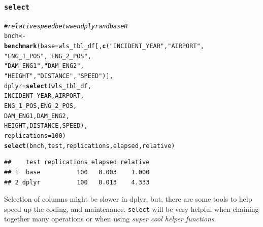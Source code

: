 \documentclass{beamer}\usepackage[]{graphicx}\usepackage[]{color}
\makeatletter
\newcommand{\hlnum}[1]{\textcolor[rgb]{0.686,0.059,0.569}{#1}}%
\newcommand{\hlstr}[1]{\textcolor[rgb]{0.192,0.494,0.8}{#1}}%
\newcommand{\hlcom}[1]{\textcolor[rgb]{0.678,0.584,0.686}{\textit{#1}}}%
\newcommand{\hlstd}[1]{\textcolor[rgb]{0.345,0.345,0.345}{#1}}%
\newcommand{\hlkwb}[1]{\textcolor[rgb]{0.69,0.353,0.396}{#1}}%
\newcommand{\hlkwc}[1]{\textcolor[rgb]{0.333,0.667,0.333}{#1}}%
\newcommand{\hlkwd}[1]{\textcolor[rgb]{0.737,0.353,0.396}{\textbf{#1}}}%
\newenvironment{kframe}{%
 \def\at@end@of@kframe{}%
 \ifinner\ifhmode%
  \def\at@end@of@kframe{\end{minipage}}%
  \begin{minipage}{\columnwidth}%
 \fi\fi%
 \def\FrameCommand##1{\hskip\@totalleftmargin \hskip-\fboxsep
 \colorbox{shadecolor}{##1}\hskip-\fboxsep
     \hskip-\linewidth \hskip-\@totalleftmargin \hskip\columnwidth}%
 \MakeFramed {\advance\hsize-\width
   \@totalleftmargin\z@ \linewidth\hsize
   \@setminipage}}%
 {\par\unskip\endMakeFramed%
 \at@end@of@kframe}
\newenvironment{knitrout}{}{} %
\makeatother
\begin{document}
\begin{frame}[fragile]
  \frametitle{{\tt select}}
\begin{knitrout}\footnotesize
{}\color{fgcolor}\begin{kframe}
\begin{alltt}
\hlcom{# relative speed betwwen dplyr and base R}
\hlstd{bnch} \hlkwb{<-}
  \hlkwd{benchmark}\hlstd{(}\hlkwc{base}  \hlstd{= wls_tbl_df[,} \hlkwd{c}\hlstd{(}\hlstr{"INCIDENT_YEAR"}\hlstd{,} \hlstr{"AIRPORT"}\hlstd{,}
                                   \hlstr{"ENG_1_POS"}\hlstd{,} \hlstr{"ENG_2_POS"}\hlstd{,}
                                   \hlstr{"DAM_ENG1"}\hlstd{,} \hlstr{"DAM_ENG2"}\hlstd{,}
                                   \hlstr{"HEIGHT"}\hlstd{,} \hlstr{"DISTANCE"}\hlstd{,} \hlstr{"SPEED"}\hlstd{)],}
            \hlkwc{dplyr} \hlstd{=} \hlkwd{select}\hlstd{(wls_tbl_df,}
                           \hlstd{INCIDENT_YEAR, AIRPORT,}
                           \hlstd{ENG_1_POS, ENG_2_POS,}
                           \hlstd{DAM_ENG1, DAM_ENG2,}
                           \hlstd{HEIGHT, DISTANCE, SPEED),}
            \hlkwc{replications} \hlstd{=} \hlnum{100}\hlstd{)}
\hlkwd{select}\hlstd{(bnch, test, replications, elapsed, relative)}
\end{alltt}
\begin{verbatim}
##    test replications elapsed relative
## 1  base          100   0.003    1.000
## 2 dplyr          100   0.013    4.333
\end{verbatim}
\end{kframe}
\end{knitrout}

Selection of columns might be slower in dplyr, but, there are some
tools to help speed up the coding, and maintenance.  {\tt select} will be very
helpful when chaining together many operations or when using \emph{super cool
helper functions}.
\end{frame} 
\end{document}
